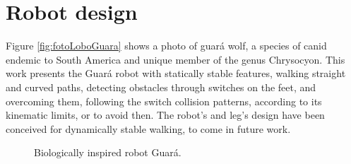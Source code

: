 \section{Robot design}
Figure \ref{fig:fotoLoboGuara} shows a photo of guar\'a wolf, a species of canid endemic to South America and unique member of the genus Chrysocyon. This work presents the Guar\'a robot with statically stable features, walking straight and curved paths, detecting obstacles through switches on the feet, and overcoming them, following the switch collision patterns, according to its kinematic limits, or to avoid then. The robot's and leg's design have been conceived for dynamically stable walking, to come in future work.  
\begin{figure}[htb!]
	\begin{center}
	\caption{Biologically inspired robot Guar\'a.}
	\end{center}
\end{figure}

